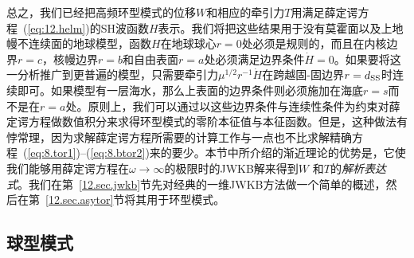 总之，我们已经把高频环型模式的位移$W$和相应的牵引力$T$用满足薛定谔方程~(\ref{eq:12.helm})的SH波函数$H$表示。我们将把这些结果用于没有莫霍面以及上地幔不连续面的地球模型，函数$H$在地球球心$r=0$处必须是规则的，而且在内核边界$r=c$，核幔边界$r=b$和自由表面$r=a$处必须满足边界条件$\dot{H}=0$。如果要将这一分析推广到更普遍的模型，只需要牵引力$\mu^{1/2}r^{-1}\dot{H}$在跨越固-固边界$r=d_{\rm SS}$时连续即可。如果模型有一层海水，那么上表面的边界条件则必须施加在海底$r=s$而不是在$r=a$处。原则上，我们可以通过以这些边界条件与连续性条件为约束对薛定谔方程做数值积分来求得环型模式的零阶本征值与本征函数。但是，这种做法有悖常理，因为求解薛定谔方程所需要的计算工作与一点也不比求解精确方程~(\ref{eq:8.tor1})--(\ref{eq:8.btor2})来的要少。本节中所介绍的渐近理论的优势是，它使我们能够用薛定谔方程在$\omega\rightarrow\infty$的极限时的JWKB解来得到$W$
和$T$的{\em 解析表达式\/}。我们在第~\ref{12.sec.jwkb}节先对经典的一维JWKB方法做一个简单的概述，然后在第~\ref{12.sec.asytor}节将其用于环型模式。
%

\subsection{球型模式}
%

